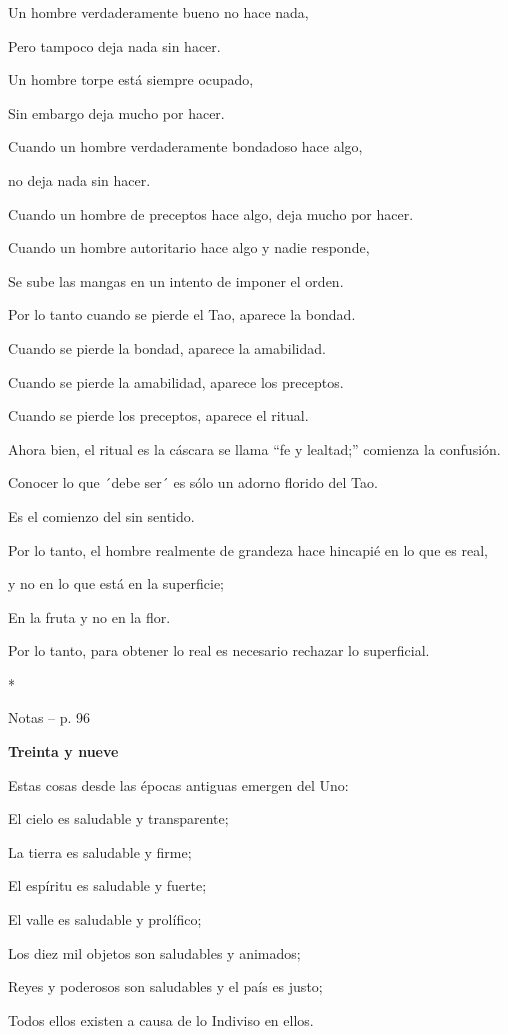 Un hombre verdaderamente bueno no hace nada,

Pero tampoco deja nada sin hacer.

Un hombre torpe está siempre ocupado,

Sin embargo deja mucho por hacer.

Cuando un hombre verdaderamente bondadoso hace algo,

no deja nada sin hacer.

Cuando un hombre de preceptos hace algo, deja mucho por hacer.

Cuando un hombre autoritario hace algo y nadie responde,

Se sube las mangas en un intento de imponer el orden.

Por lo tanto cuando se pierde el Tao, aparece la bondad.

Cuando se pierde la bondad, aparece la amabilidad.

Cuando se pierde la amabilidad, aparece los preceptos.

Cuando se pierde los preceptos, aparece el ritual.

Ahora bien, el ritual es la cáscara se llama ``fe y lealtad;'' comienza
la confusión.

Conocer lo que ´debe ser´ es sólo un adorno florido del Tao.

Es el comienzo del sin sentido.

Por lo tanto, el hombre realmente de grandeza hace hincapié en lo que es
real,

y no en lo que está en la superficie;

En la fruta y no en la flor.

Por lo tanto, para obtener lo real es necesario rechazar lo superficial.

*

Notas -- p. 96

\textbf{Treinta y nueve}

Estas cosas desde las épocas antiguas emergen del Uno:

El cielo es saludable y transparente;

La tierra es saludable y firme;

El espíritu es saludable y fuerte;

El valle es saludable y prolífico;

Los diez mil objetos son saludables y animados;

Reyes y poderosos son saludables y el país es justo;

Todos ellos existen a causa de lo Indiviso en ellos.

